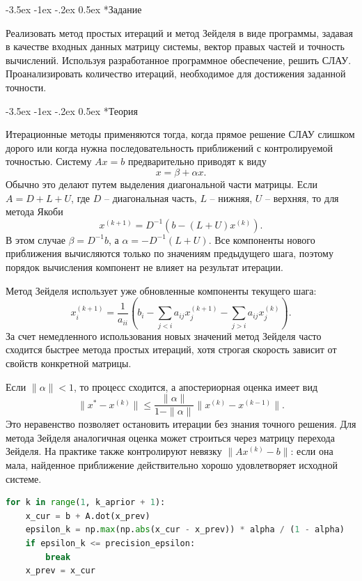 \documentclass[14pt, a4paper]{article}
\makeatletter
\renewcommand\section{\@startsection {section}{1}{\parindent}%
  {-3.5ex \@plus -1ex \@minus -.2ex}%
  {0.5ex}%
  {\normalfont\Large\bfseries}}
\makeatother
\begin{document}
\section*{Задание}
Реализовать метод простых итераций и метод Зейделя в виде программы, задавая в качестве входных данных матрицу системы, вектор правых частей и точность вычислений. Используя разработанное программное обеспечение, решить СЛАУ. Проанализировать количество итераций, необходимое для достижения заданной точности.

\section*{Теория}
Итерационные методы применяются тогда, когда прямое решение СЛАУ слишком дорого или когда нужна последовательность приближений с контролируемой точностью. Систему $Ax=b$ предварительно приводят к виду
\[
    x = \beta + \alpha x.
\]
Обычно это делают путем выделения диагональной части матрицы. Если $A=D+L+U$, где $D$ -- диагональная часть, $L$ -- нижняя, $U$ -- верхняя, то для метода Якоби
\[
    x^{(k+1)}=D^{-1}(b-(L+U)x^{(k)}).
\]
В этом случае $\beta=D^{-1}b$, а $\alpha=-D^{-1}(L+U)$. Все компоненты нового приближения вычисляются только по значениям предыдущего шага, поэтому порядок вычисления компонент не влияет на результат итерации.

Метод Зейделя использует уже обновленные компоненты текущего шага:
\[
    x_i^{(k+1)}=\frac{1}{a_{ii}}\left(b_i-\sum_{j<i}a_{ij}x_j^{(k+1)}-\sum_{j>i}a_{ij}x_j^{(k)}\right).
\]
За счет немедленного использования новых значений метод Зейделя часто сходится быстрее метода простых итераций, хотя строгая скорость зависит от свойств конкретной матрицы.

Если $\|\alpha\|<1$, то процесс сходится, а апостериорная оценка имеет вид
\[
    \|x^*-x^{(k)}\| \le \frac{\|\alpha\|}{1-\|\alpha\|}\|x^{(k)}-x^{(k-1)}\|.
\]
Это неравенство позволяет остановить итерации без знания точного решения. Для метода Зейделя аналогичная оценка может строиться через матрицу перехода Зейделя. На практике также контролируют невязку $\|Ax^{(k)}-b\|$: если она мала, найденное приближение действительно хорошо удовлетворяет исходной системе.

\begin{lstlisting}[language=Python]
for k in range(1, k_aprior + 1):
    x_cur = b + A.dot(x_prev)
    epsilon_k = np.max(np.abs(x_cur - x_prev)) * alpha / (1 - alpha)
    if epsilon_k <= precision_epsilon:
        break
    x_prev = x_cur
\end{lstlisting}
\end{document}
